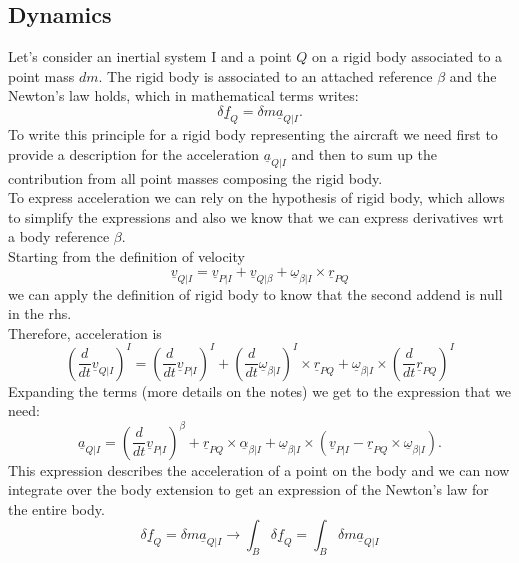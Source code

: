 \subsection{Dynamics}
Let's consider an inertial system I and a point $Q$ on a rigid body associated to a point mass $dm$. The rigid body is associated to an attached reference $\beta$ and the Newton's law holds, which in mathematical terms writes:
\begin{equation}
    \delta \underline{f}_Q = \delta m \underline{a}_{Q|I}.
\end{equation}
To write this principle for a rigid body representing the aircraft we need first to provide a description for the acceleration $\underline{a}_{Q|I}$ and then to sum up the contribution from all point masses composing the rigid body.
\\
To express acceleration we can rely on the hypothesis of rigid body, which allows to simplify the expressions and also we know that we can express derivatives wrt a body reference $\beta$.
\\
Starting from the definition of velocity
\begin{equation}
    \underline{v}_{Q|I} = \underline{v}_{P|I}+\underline{v}_{Q|\beta}+\underline{\omega}_{\beta|I}\times \underline{r}_{PQ}
\end{equation}
we can apply the definition of rigid body to know that the second addend is null in the rhs.
\\
Therefore, acceleration is
\begin{equation}
    \left(\frac{d}{dt}\underline{v}_{Q|I}\right)^I = \left(\frac{d}{dt}\underline{v}_{P|I}\right)^I +\left(\frac{d}{dt}\underline{\omega}_{\beta|I}\right)^I\times \underline{r}_{PQ} + \underline{\omega}_{\beta|I} \times\left(\frac{d}{dt}\underline{r}_{PQ}\right)^I 
\end{equation}
Expanding the terms (more details on the notes) we get to the expression that we need:
\begin{equation}
    \underline{a}_{Q|I} = \left(\frac{d}{dt}\underline{v}_{P|I}\right)^\beta + \underline{r}_{PQ}\times \underline{\alpha}_{\beta|I} + \underline{\omega}_{\beta|I}\times \left(\underline{v}_{P|I}- \underline{r}_{PQ} \times \underline{\omega}_{\beta|I} \right).
\end{equation}
This expression describes the acceleration of a point on the body and we can now integrate over the body extension to get an expression of the Newton's law for the entire body.
\begin{equation}
    \delta \underline{f}_Q = \delta m \underline{a}_{Q|I} \to \int_B\delta \underline{f}_Q = \int_B\delta m \underline{a}_{Q|I}
\end{equation}
